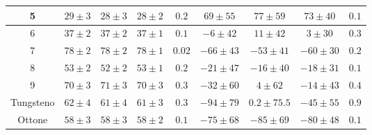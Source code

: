 \documentclass[a4paper,11pt,oneside]{article}
\begin{document}
\begin{table}[h!]
\begin{center}
{\begin{tabular}{|c|c|c|c|c||c|c|c|c|}
    {\cellcolor[rgb]{0.85,0.85,0.85}}5 & {\cellcolor[rgb]{0.85,0.85,0.85}}$29\pm3$ & {\cellcolor[rgb]{0.85,0.85,0.85}}$28\pm3$ & {\cellcolor[rgb]{0.85,0.85,0.85}}$28\pm2$ & {\cellcolor[rgb]{0.85,0.85,0.85}}$0.2$ & {\cellcolor[rgb]{0.85,0.85,0.85}}$69\pm55$ & {\cellcolor[rgb]{0.85,0.85,0.85}}$77\pm59$ & {\cellcolor[rgb]{0.85,0.85,0.85}}$73\pm40$ & {\cellcolor[rgb]{0.85,0.85,0.85}}$0.1$\\ \hline
    6 & $37\pm2$ & $37\pm2$ & $37\pm1$ & $0.1$ & $-6\pm42$ & $11\pm42$ & $3\pm30$ & $0.3$\\ \hline
    {\cellcolor[rgb]{0.85,0.85,0.85}}7 & {\cellcolor[rgb]{0.85,0.85,0.85}}$78\pm2$ & {\cellcolor[rgb]{0.85,0.85,0.85}}$78\pm2$ & {\cellcolor[rgb]{0.85,0.85,0.85}}$78\pm1$ & {\cellcolor[rgb]{0.85,0.85,0.85}}$0.02$ & {\cellcolor[rgb]{0.85,0.85,0.85}}$-66\pm43$ & {\cellcolor[rgb]{0.85,0.85,0.85}}$-53\pm41$ & {\cellcolor[rgb]{0.85,0.85,0.85}}$-60\pm30$ & {\cellcolor[rgb]{0.85,0.85,0.85}}$0.2$\\ \hline
    8 & $53\pm2$ & $52\pm2$ & $53\pm1$ & $0.2$ & $-21\pm47$ & $-16\pm40$ & $-18\pm31$ & $0.1$\\ \hline
    {\cellcolor[rgb]{0.85,0.85,0.85}}9 & {\cellcolor[rgb]{0.85,0.85,0.85}}$70\pm3$ & {\cellcolor[rgb]{0.85,0.85,0.85}}$71\pm3$ & {\cellcolor[rgb]{0.85,0.85,0.85}}$70\pm3$ & {\cellcolor[rgb]{0.85,0.85,0.85}}$0.3$ & {\cellcolor[rgb]{0.85,0.85,0.85}}$-32\pm60$ & {\cellcolor[rgb]{0.85,0.85,0.85}}$4\pm62$ & {\cellcolor[rgb]{0.85,0.85,0.85}}$-14\pm43$ & {\cellcolor[rgb]{0.85,0.85,0.85}}$0.4$\\ \hline \hline
    Tungsteno & $62\pm4$ & $61\pm4$ & $61\pm3$ & $0.3$ & $-94\pm79$ & $0.2\pm75.5$ & $-45\pm55$ & $0.9$\\ \hline
    {\cellcolor[rgb]{0.85,0.85,0.85}}Ottone & {\cellcolor[rgb]{0.85,0.85,0.85}}$58\pm3$ & {\cellcolor[rgb]{0.85,0.85,0.85}}$58\pm3$ & {\cellcolor[rgb]{0.85,0.85,0.85}}$58\pm2$ & {\cellcolor[rgb]{0.85,0.85,0.85}}$0.1$ & {\cellcolor[rgb]{0.85,0.85,0.85}}$-75\pm68$ & {\cellcolor[rgb]{0.85,0.85,0.85}}$-85\pm69$ & {\cellcolor[rgb]{0.85,0.85,0.85}}$-80\pm48$ & {\cellcolor[rgb]{0.85,0.85,0.85}}$0.1$\\ \hline
    \end{tabular}}
    \end{center}
\end{table}
\newpage
\end{document}
